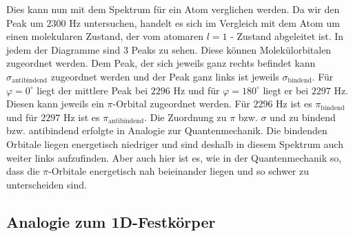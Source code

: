 \documentclass[german,  %
parskip=full,  %
]{scrartcl}
\begin{document}
Dies kann nun mit dem Spektrum für ein Atom verglichen werden. Da wir den Peak um $2300$ Hz untersuchen, handelt es sich im Vergleich mit dem Atom um einen molekularen Zustand, der vom atomaren $l=1$ - Zustand abgeleitet ist.
In jedem der Diagramme sind 3 Peaks zu sehen. Diese können Molekülorbitalen zugeordnet werden.
Dem Peak, der sich jeweils ganz rechts befindet kann $\sigma_{\mathrm{antibindend}}$ zugeordnet werden und der Peak ganz links ist jeweils $\sigma_{\mathrm{bindend}}$. Für $\varphi=0^{\circ}$ liegt der mittlere Peak bei $2296$ Hz und für $\varphi=180^{\circ}$ liegt er bei $2297$ Hz. Diesen kann jeweils ein $\pi$-Orbital zugeordnet werden. Für $2296$ Hz ist es $\pi_{\mathrm{bindend}}$ und für $2297$ Hz ist es $\pi_{\mathrm{antibindend}}$. Die Zuordnung zu $\pi$ bzw. $\sigma$ und zu bindend bzw. antibindend erfolgte in Analogie zur Quantenmechanik. Die bindenden Orbitale liegen energetisch niedriger und sind deshalb in diesem Spektrum auch weiter links aufzufinden. Aber auch hier ist es, wie in der Quantenmechanik so, dass die $\pi$-Orbitale energetisch nah beieinander liegen und so schwer zu unterscheiden sind.

\subsection{Analogie zum 1D-Festkörper}
\end{document}
